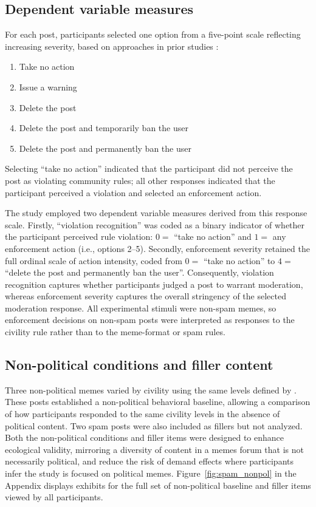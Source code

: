 \documentclass[12pt]{article}
\begin{document}
\subsection{Dependent variable measures}

For each post, participants selected one option from a five-point scale reflecting increasing severity, based on approaches in prior studies \parencite{kozyrevaResolvingContentModeration2023,solomonIllusoryInterpartyDisagreement2024}:

\begin{enumerate}
    \item Take no action
    \item Issue a warning
    \item Delete the post
    \item Delete the post and temporarily ban the user
    \item Delete the post and permanently ban the user
\end{enumerate}

Selecting \enquote{take no action} indicated that the participant did not perceive the post as violating community rules; all other responses indicated that the participant perceived a violation and selected an enforcement action.

The study employed two dependent variable measures derived from this response scale. Firstly, \enquote{violation recognition} was coded as a binary indicator of whether the participant perceived rule violation: $0 =$ \enquote{take no action} and $1 =$ any enforcement action (i.e., options 2--5). Secondly, enforcement severity retained the full ordinal scale of action intensity, coded from $0 =$ \enquote{take no action} to $4 =$ \enquote{delete the post and permanently ban the user}. Consequently, violation recognition captures whether participants judged a post to warrant moderation, whereas enforcement severity captures the overall stringency of the selected moderation response. All experimental stimuli were non-spam memes, so enforcement decisions on non-spam posts were interpreted as responses to the civility rule rather than to the meme-format or spam rules.

\subsection{Non-political conditions and filler content}

Three non-political memes varied by civility using the same levels defined by \textcite{solomonIllusoryInterpartyDisagreement2024}. These posts established a non-political behavioral baseline, allowing a comparison of how participants responded to the same civility levels in the absence of political content. Two spam posts were also included as fillers but not analyzed. Both the non-political conditions and filler items were designed to enhance ecological validity, mirroring a diversity of content in a memes forum that is not necessarily political, and reduce the risk of demand effects where participants infer the study is focused on political memes. Figure~\ref{fig:spam_nonpol} in the Appendix displays exhibits for the full set of non-political baseline and filler items viewed by all participants.
\end{document}
